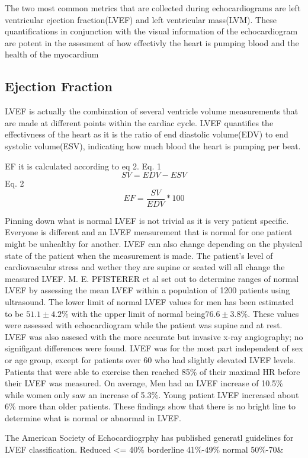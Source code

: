 \documentclass{article}
\begin{document}
The two most common metrics that are collected during echocardiograms are left ventricular ejection fraction(LVEF) and left ventricular mass(LVM).\cite{ase_chamber_quant_update}
These quantifications in conjunction with the visual information of the echocardiogram are potent in the assesment of how effectivly the heart is pumping blood and the health of the myocardium

\subsection{Ejection Fraction}
LVEF is actually the combination of several ventricle volume measurements that are made at different points within the cardiac cycle.
LVEF quantifies the effectivness of the heart as it is the ratio of end diastolic volume(EDV) to end systolic volume(ESV), indicating how much blood the heart is pumping per beat.

EF it is calculated according to eq 2.
Eq. 1
\[SV = EDV - ESV\]
Eq. 2
\[EF = \frac{SV}{EDV} * 100   \]  

Pinning down what is normal LVEF is not trivial as it is very patient specific.
Everyone is different and an LVEF measurement that is normal for one patient might be unhealthy for another.
LVEF can also change depending on the physical state of the patient when the measurement is made.
The patient's level of cardiovascular stress and wether they are supine or seated will all change the measured LVEF.
M. E. PFISTERER et al set out to determine ranges of normal LVEF by assessing the mean LVEF within a population of 1200 patients using ultrasound.
The lower limit of normal LVEF values for men has been estimated to be $ 51.1 \pm 4.2\%$ with the upper limit of normal being$ 76.6 \pm 3.8\%$.
These values were assessed with echocardiogram while the patient was supine and at rest.
LVEF was also assesed with the more accurate but invasive x-ray angiography; no signifigant differences were found.
LVEF was for the most part independent of sex or age group, except for patients over 60 who had slightly elevated LVEF levels.
Patients that were able to exercise then reached 85\% of their maximal HR before their LVEF was measured.
On average, Men had an LVEF increase of 10.5\% while women only saw an increase of 5.3\%.
Young patient LVEF increased about 6\% more than older patients\cite{norm_EF_values}.
These findings show that there is no bright line to determine what is normal or abnormal in LVEF.

The American Society of Echocardiogrphy has published generatl guidelines for LVEF classification.
Reduced <= 40\%
borderline 41\%-49\%
normal 50\%-70\&
\end{document}
